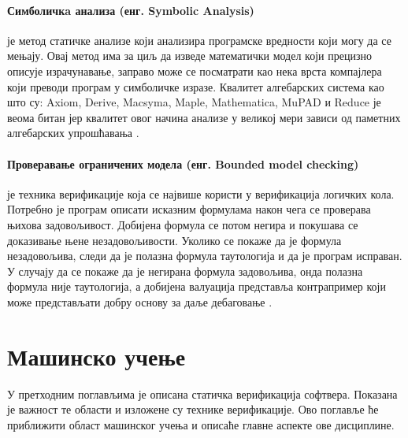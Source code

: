 \documentclass[a4paper]{article}
\begin{document}
{\paragraph{Симболичкa анализа (енг. Symbolic Analysis)} је метод статичке анализе који анализира
програмске вредности који могу да се мењају.
Овај метод има за циљ да изведе математички модел који прецизно описује израчунавање,
заправо може се посматрати као нека врста компајлера који преводи програм у симболичке изразе.
Квалитет алгебарских система као што су: Axiom, Derive, Macsyma, Maple, Mathematica, MuPAD и Reduce
је веома битан јер квалитет овог начина анализе у великој мери зависи од паметних алгебарских упрошћавања \cite{survey}. 


\paragraph{Проверавање ограничених модела (енг. Bounded model checking)} је техника верификације
која се највише користи у верификација логичких кола.
Потребно је програм описати исказним формулама након чега се проверава њихова задовољивост.
Добијена формула се потом негира и покушава се доказивање њене незадовољивости. Уколико
се покаже да је формула незадовољива, следи да је полазна формула таутологија
и да је програм исправан. У случају
да се покаже да је негирана формула задовољива, онда полазна формула није таутологија,
а добијена валуација представља контрапример који може представљати добру основу
за даље дебаговање \cite{dkw2008, survey}.


\section{Машинско учење}
\label{sec:ml_intro}
У претходним поглављима је описана статичка верификација софтвера. Показана је важност те области и изложене су технике верификације. Ово поглавље ће приближити област машинског учења и описаће главне аспекте ове дисциплине.

}
\end{document}
